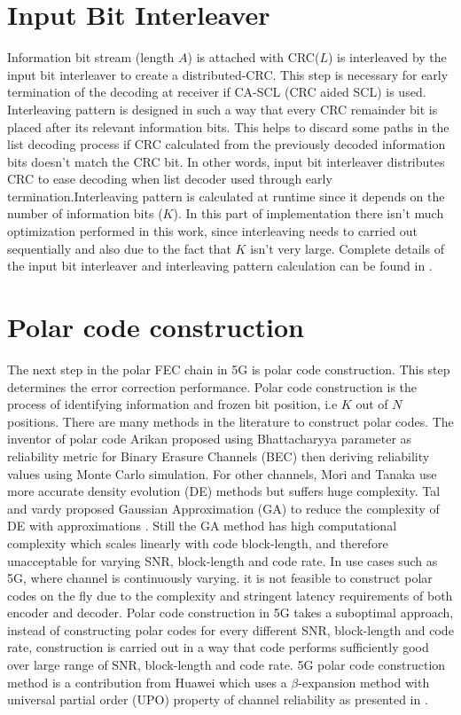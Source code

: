 \section{Input Bit Interleaver}
Information bit stream (length $A$) is attached with CRC($L$) is interleaved by the input bit interleaver to create a distributed-CRC. This step is necessary for early termination of the decoding at receiver if CA-SCL (CRC aided SCL) is used. Interleaving pattern is designed in such a way that every CRC remainder bit is placed after its relevant information bits. This helps to discard some paths in the list decoding process if CRC calculated from the previously decoded information bits doesn't match the CRC bit. In other words, input bit interleaver distributes CRC to ease decoding when list decoder used through early termination.Interleaving pattern is calculated at runtime since it depends on the number of information bits ($K$). In this part of implementation there isn't much optimization performed in this work, since interleaving needs to carried out sequentially and also due to the fact that $K$ isn't very large. Complete details of the input bit interleaver and interleaving pattern calculation can be found in \cite{3gpp.38.212}.

\section{Polar code construction}
The next step in the polar FEC chain in 5G is polar code construction. This step determines the error correction performance. Polar code construction is the process of identifying information and frozen bit position, i.e $K$ out of $N$ positions. There are many methods in the literature to construct polar codes. The inventor of polar code Arikan \cite{Arikan} proposed using Bhattacharyya parameter as reliability metric for Binary Erasure Channels (BEC) then deriving reliability values using Monte Carlo simulation. For other channels, Mori and Tanaka \cite{MoriTanakaDE} use more accurate density evolution (DE) methods but suffers huge complexity. Tal and vardy proposed Gaussian Approximation (GA) to reduce the complexity of DE with approximations \cite{TalVardyGA}. Still the GA method has high computational complexity which scales linearly with code block-length, and therefore unacceptable for varying SNR, block-length and code rate. In use cases such as 5G, where channel is continuously varying. it is not feasible to construct polar codes on the fly due to the complexity and stringent latency requirements of both encoder and decoder. Polar code construction in 5G takes a suboptimal approach, instead of constructing polar codes for every different SNR, block-length and code rate, construction is carried out in a way that code performs sufficiently good over large range of SNR, block-length and code rate. 5G polar code construction method is a contribution from Huawei which uses a $\beta$-expansion method with universal partial order (UPO) property of channel reliability as presented in \cite{betaExpansion}.


